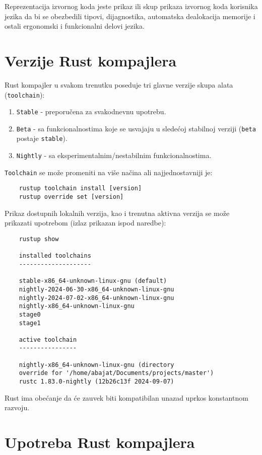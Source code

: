 \documentclass{article}
\begin{document}
Reprezentacija izvornog koda jeste prikaz ili skup prikaza izvornog koda korisnika jezika da bi se obezbedili tipovi, dijagnostika,
automatska dealokacija memorije i ostali ergonomski i funkcionalni delovi jezika.
\newpage


\section{Verzije Rust kompajlera}

Rust kompajler u svakom trenutku poseduje tri glavne verzije skupa alata (\verb|toolchain|):

\begin{enumerate}
    \item \verb|Stable| - preporučena za svakodnevnu upotrebu. 
    \item \verb|Beta| - sa funkcionalnostima koje se usvajaju u sledećoj stabilnoj verziji (\verb|beta| postaje \verb|stable|).
    \item \verb|Nightly| - sa eksperimentalnim/nestabilnim funkcionalnostima. 
\end{enumerate}

\verb|Toolchain| se može promeniti na više načina ali najjednostavniji je:
\begin{verbatim}
    rustup toolchain install [version]
    rustup override set [version]
\end{verbatim}

Prikaz dostupnih lokalnih verzija, kao i trenutna aktivna verzija se može prikazati upotrebom (izlaz prikazan ispod naredbe):
\begin{verbatim}
    rustup show

    installed toolchains
    --------------------
    
    stable-x86_64-unknown-linux-gnu (default)
    nightly-2024-06-30-x86_64-unknown-linux-gnu
    nightly-2024-07-02-x86_64-unknown-linux-gnu
    nightly-x86_64-unknown-linux-gnu
    stage0
    stage1
    
    active toolchain
    ----------------

    nightly-x86_64-unknown-linux-gnu (directory 
    override for '/home/abajat/Documents/projects/master')
    rustc 1.83.0-nightly (12b26c13f 2024-09-07)
\end{verbatim}

Rust ima obećanje da će zauvek biti kompatibilan unazad uprkos konstantnom razvoju.

\newpage

\section{Upotreba Rust kompajlera}
\end{document}
